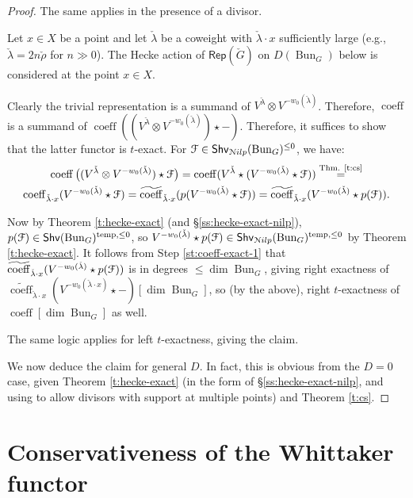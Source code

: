 \documentclass[reqno,11pt]{amsart}
\numberwithin{equation}{subsection}
\theoremstyle{remark}
\newcommand{\sF}{{\EuScript F}}
\newcommand{\sN}{{\EuScript N}}
\newcommand{\on}{\operatorname}
\newcommand{\Rep}{\mathsf{Rep}}
\newcommand{\Bun}{\on{Bun}}
\newcommand{\coeff}{\on{coeff}}
\newcommand{\Shv}{\mathsf{Shv}}
\newcommand{\temp}{\on{temp}}
\newcommand{\Nilp}{\sN ilp}
\begin{document}
\begin{proof}
\noindent The same applies in the presence of a divisor. 

Let $x \in X$ be a point and let 
$\check{\lambda}$ be a coweight with $\check{\lambda}\cdot x$ sufficiently 
large (e.g., $\check{\lambda} = 2n\check{\rho}$ for $n\gg 0$).
The Hecke action of $\Rep(\check{G})$ on $D(\Bun_G)$ below is 
considered at the point $x \in X$.

Clearly the trivial representation 
is a summand of $V^{\check{\lambda}} \otimes V^{-w_0(\check{\lambda})}$. 
Therefore, $\coeff$ is a summand of 
$\coeff((V^{\check{\lambda}} \otimes V^{-w_0(\check{\lambda})})\star -)$.
Therefore, it suffices to show that the latter functor is $t$-exact.
For $\sF \in \Shv_{\Nilp}(\Bun_G)^{\leq 0}$, we have:
%
\[
\begin{gathered}
\coeff\big((V^{\check{\lambda}} \otimes V^{-w_0(\check{\lambda})})\star \sF\big) = 
\coeff(V^{\check{\lambda}} \star (V^{-w_0(\check{\lambda})}\star \sF)) 
\overset{\text{Thm. \ref{t:cs}}}{=} \\ 
\coeff_{\check{\lambda} \cdot x}(V^{-w_0(\check{\lambda})} \star \sF) = 
\widetilde{\coeff}_{\check{\lambda} \cdot x}(p(V^{-w_0(\check{\lambda})}\star \sF)) = 
\widetilde{\coeff}_{\check{\lambda} \cdot x}(V^{-w_0(\check{\lambda})}\star p(\sF)). 
\end{gathered}
\]

\noindent Now by Theorem \ref{t:hecke-exact} (and \S \ref{ss:hecke-exact-nilp}),
$p(\sF) \in \Shv(\Bun_G)^{\temp,\leq 0}$,
so $V^{-w_0(\check{\lambda})} \star p(\sF) \in \Shv_{\Nilp}(\Bun_G)^{\temp,\leq 0}$ by 
Theorem \ref{t:hecke-exact}. 
It follows from Step \ref{st:coeff-exact-1} that 
$\widetilde{\coeff}_{\check{\lambda}\cdot x}(V^{-w_0(\check{\lambda})}\star p(\sF))$ 
is in degrees $\leq \dim \Bun_G$,
giving right exactness of $\widetilde{\coeff}_{\check{\lambda}\cdot x}(V^{-w_0(\check{\lambda}\cdot x)} \star -)[\dim \Bun_G]$,
so (by the above), right $t$-exactness of $\coeff[\dim \Bun_G]$ as well.

The same logic applies for left $t$-exactness, giving the claim.

\step We now deduce the claim for general $D$. In fact, this is obvious
from the $D = 0$ case, given Theorem \ref{t:hecke-exact} (in the form
of \S \ref{ss:hecke-exact-nilp}, and using \cite{independence} to allow
divisors with support at multiple points) and Theorem \ref{t:cs}.

\end{proof}

\part{Conservativeness of the Whittaker functor}
\end{document}
